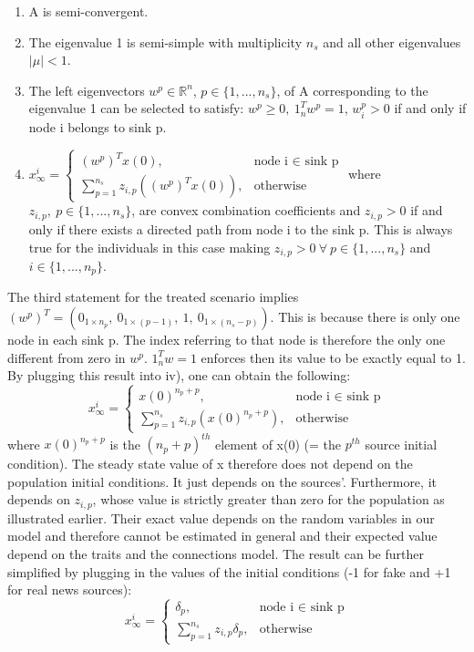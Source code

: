 \begin{enumerate}
	\item
	A is semi-convergent.
	\item
	The eigenvalue 1 is semi-simple with multiplicity $n_s$ and all other eigenvalues $|\mu|<1$.
	\item
	The left eigenvectors $w^p \in \mathbb{R}^n$, $p\in \{1,...,n_s\}$, of A corresponding to the eigenvalue 1 can be selected to satisfy: $w^p\geq0,\ 1_n^Tw^p=1$, $w^p_i>0$ if and only if node i belongs to sink p.
	\item
	$
	x_{\infty}^i = 
	\begin{cases}
	(w^p)^Tx(0),& \text{node i $\in$ sink p}\\
	\sum_{p=1}^{n_s} z_{i,p}((w^p)^Tx(0)), & \text{otherwise}
	\end{cases}
	$
	where $z_{i,p},\ p\in\{1,...,n_s\}$, are convex combination coefficients and $z_{i,p} > 0$ if and only if there exists a directed path from node i to the sink p. This is always true for the individuals in this case making $z_{i,p} > 0\ \forall\ p \in \{1,...,n_s\}$ and $i \in \{1,...,n_p\}$.
\end{enumerate}
The third statement for the treated scenario implies $(w^p)^T = (0_{1 \times n_p},\ 0_{1 \times (p-1)},\ 1,\ 0_{1 \times (n_s-p)})$. This is because there is only one node in each sink p. The index referring to that node is therefore the only one different from zero in $w^p$. $1_n^Tw=1$ enforces then its value to be exactly equal to 1. By plugging this result into iv), one can obtain the following:
$$
x_{\infty}^i = 
\begin{cases}
	x(0)^{n_p+p},& \text{node i $\in$ sink p}\\
	\sum_{p=1}^{n_s} z_{i,p}(x(0)^{n_p+p}), & \text{otherwise}
\end{cases}
$$
where $x(0)^{n_p+p}$ is the $(n_p+p)^{th}$ element of x(0) (= the $p^{th}$ source initial condition). The steady state value of x therefore does not depend on the population initial conditions. It just depends on the sources'. Furthermore, it depends on $z_{i,p}$, whose value is strictly greater than zero for the population as  illustrated earlier. Their exact value depends on the random variables in our model and therefore cannot be estimated in general and their expected value depend on the traits and the connections model. \newline
The result can be further simplified by plugging in the values of the initial conditions (-1 for fake and +1 for real news sources):
$$
x_{\infty}^i = 
\begin{cases}
\delta_p,& \text{node i $\in$ sink p}\\
\sum_{p=1}^{n_s} z_{i,p}\delta_p, & \text{otherwise}
\end{cases}
$$
